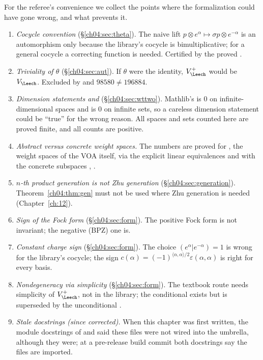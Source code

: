 For the referee's convenience we collect the points where the formalization could have gone wrong,
and what prevents it.
\begin{enumerate}[label=(\arabic*)]
\item \emph{Cocycle convention} (\S\ref{ch04:sec:theta}). The naive lift
  $p\otimes e^\alpha\mapsto\sigma p\otimes e^{-\alpha}$ is an automorphism only because the library's
  cocycle is bimultiplicative; for a general cocycle a correcting function is needed. Certified by the
  proved .
\item \emph{Triviality of $\theta$} (\S\ref{ch04:sec:aut}). If $\theta$ were the identity, $V_\Leech^+$
  would be $V_\Leech$. Excluded by  and $98580\neq196884$.
\item \emph{Dimension statements and } (\S\ref{ch04:sec:wttwo}). Mathlib's
   is $0$ on infinite-dimensional spaces and  is $0$ on infinite sets,
  so a careless dimension statement could be ``true'' for the wrong reason. All spaces and sets
  counted here are proved finite, and all counts are positive.
\item \emph{Abstract versus concrete weight spaces.} The numbers are proved for
  , the weight spaces of the VOA itself, via the explicit linear
  equivalences  and  with the
  concrete subspaces , .
\item \emph{$n$-th product generation is not Zhu generation} (\S\ref{ch04:sec:generation}).
  Theorem~\ref{ch04:thm:gen} must not be used where Zhu generation is needed (Chapter~\ref{ch:12}).
\item \emph{Sign of the Fock form} (\S\ref{ch04:sec:form}). The positive Fock form is not invariant;
  the negative (BPZ) one is.
\item \emph{Constant charge sign} (\S\ref{ch04:sec:form}). The choice $(e^\alpha|e^{-\alpha})=1$ is wrong
  for the library's cocycle; the sign $c(\alpha)=(-1)^{\langle\alpha,\alpha\rangle/2}\varepsilon(\alpha,\alpha)$ is
  right for every basis.
\item \emph{Nondegeneracy via simplicity} (\S\ref{ch04:sec:form}). The textbook route needs
  simplicity of $V_\Leech^+$, not in the library; the conditional
   exists but is superseded by the unconditional
  .
\item \emph{Stale docstrings (since corrected).} When this chapter was first written, the module docstrings of
   and  said these files were not wired into the
  umbrella, although they were; at a pre-release build commit both docstrings say the files are imported.
\end{enumerate}

